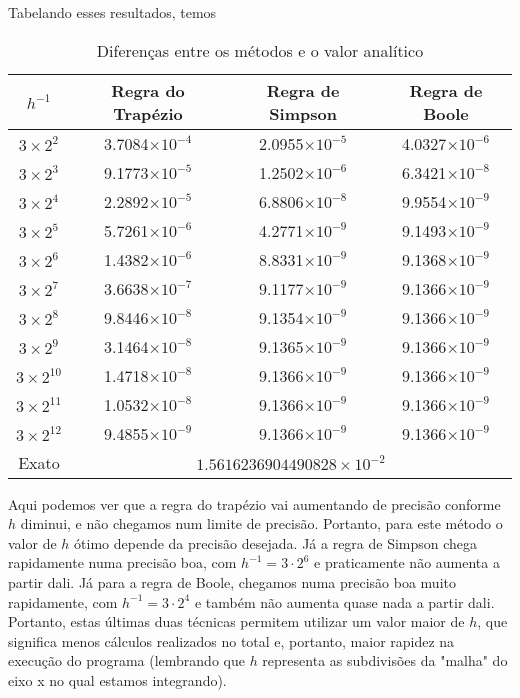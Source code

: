 \documentclass[12pt,a4paper]{article}
\begin{document}
Tabelando esses resultados, temos

\begin{table}[H]
\centering
\begin{tabular}{|c|c|c|c|}
\hline
\( h^{-1} \) & Regra do Trapézio & Regra de Simpson & Regra de Boole \\
\hline
\hline
\( 3 \times 2^2 \) & 3.7084\( \times 10^{-4} \) & 2.0955\( \times 10^{-5} \) & 4.0327\( \times 10^{-6} \) \\
\( 3 \times 2^3 \) & 9.1773\( \times 10^{-5} \) & 1.2502\( \times 10^{-6} \) & 6.3421\( \times 10^{-8} \) \\
\( 3 \times 2^4 \) & 2.2892\( \times 10^{-5} \) & 6.8806\( \times 10^{-8} \) & 9.9554\( \times 10^{-9} \) \\
\( 3 \times 2^5 \) & 5.7261\( \times 10^{-6} \) & 4.2771\( \times 10^{-9} \) & 9.1493\( \times 10^{-9} \) \\
\( 3 \times 2^6 \) & 1.4382\( \times 10^{-6} \) & 8.8331\( \times 10^{-9} \) & 9.1368\( \times 10^{-9} \) \\
\( 3 \times 2^7 \) & 3.6638\( \times 10^{-7} \) & 9.1177\( \times 10^{-9} \) & 9.1366\( \times 10^{-9} \) \\
\( 3 \times 2^8 \) & 9.8446\( \times 10^{-8} \) & 9.1354\( \times 10^{-9} \) & 9.1366\( \times 10^{-9} \) \\
\( 3 \times 2^9 \) & 3.1464\( \times 10^{-8} \) & 9.1365\( \times 10^{-9} \) & 9.1366\( \times 10^{-9} \) \\
\( 3 \times 2^{10} \) & 1.4718\( \times 10^{-8} \) & 9.1366\( \times 10^{-9} \) & 9.1366\( \times 10^{-9} \) \\
\( 3 \times 2^{11} \) & 1.0532\( \times 10^{-8} \) & 9.1366\( \times 10^{-9} \) & 9.1366\( \times 10^{-9} \) \\
\( 3 \times 2^{12} \) & 9.4855\( \times 10^{-9} \) & 9.1366\( \times 10^{-9} \) & 9.1366\( \times 10^{-9} \) \\
\hline
\hline
Exato & \multicolumn{3}{|c|}{$1.5616236904490828 \times 10^{-2}$} \\
\hline
\end{tabular}
\caption{Diferenças entre os métodos e o valor analítico}
\end{table}

Aqui podemos ver que a regra do trapézio vai aumentando de precisão conforme $h$ diminui, e não chegamos num limite de precisão. Portanto, para este método o valor de $h$ ótimo depende da precisão desejada. Já a regra de Simpson chega rapidamente numa precisão boa, com $h^{-1} = 3\cdot2^{6}$ e praticamente não aumenta a partir dali. Já para a regra de Boole, chegamos numa precisão boa muito rapidamente, com $h^{-1} = 3\cdot2^{4}$ e também não aumenta quase nada a partir dali. Portanto, estas últimas duas técnicas permitem utilizar um valor maior de $h$, que significa menos cálculos realizados no total e, portanto, maior rapidez na execução do programa (lembrando que $h$ representa as subdivisões da "malha" do eixo x no qual estamos integrando).
\end{document}
